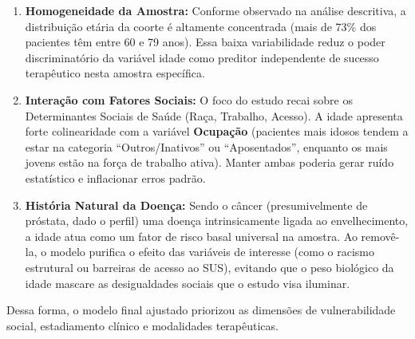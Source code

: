 \documentclass[
]{article}
\providecommand{\tightlist}{%
  \setlength{\itemsep}{0pt}\setlength{\parskip}{0pt}}
\begin{document}
\begin{enumerate}
\def\labelenumi{\arabic{enumi}.}
\tightlist
\item
  \textbf{Homogeneidade da Amostra:} Conforme observado na análise
  descritiva, a distribuição etária da coorte é altamente concentrada
  (mais de 73\% dos pacientes têm entre 60 e 79 anos). Essa baixa
  variabilidade reduz o poder discriminatório da variável idade como
  preditor independente de sucesso terapêutico nesta amostra específica.
\item
  \textbf{Interação com Fatores Sociais:} O foco do estudo recai sobre
  os Determinantes Sociais de Saúde (Raça, Trabalho, Acesso). A idade
  apresenta forte colinearidade com a variável \textbf{Ocupação}
  (pacientes mais idosos tendem a estar na categoria ``Outros/Inativos''
  ou ``Aposentados'', enquanto os mais jovens estão na força de trabalho
  ativa). Manter ambas poderia gerar ruído estatístico e inflacionar
  erros padrão.
\item
  \textbf{História Natural da Doença:} Sendo o câncer (presumivelmente
  de próstata, dado o perfil) uma doença intrinsicamente ligada ao
  envelhecimento, a idade atua como um fator de risco basal universal na
  amostra. Ao removê-la, o modelo purifica o efeito das variáveis de
  interesse (como o racismo estrutural ou barreiras de acesso ao SUS),
  evitando que o peso biológico da idade mascare as desigualdades
  sociais que o estudo visa iluminar.
\end{enumerate}

Dessa forma, o modelo final ajustado priorizou as dimensões de
vulnerabilidade social, estadiamento clínico e modalidades terapêuticas.
\end{document}
